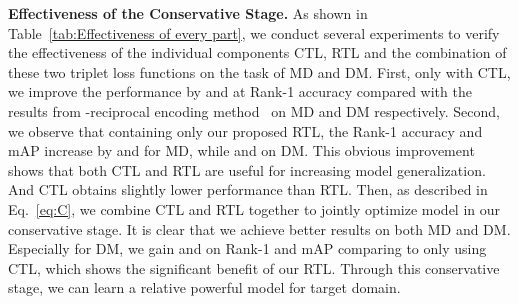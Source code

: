 \documentclass[10pt,twocolumn,letterpaper]{article}
\begin{document}
\textbf{Effectiveness of the Conservative Stage.} As shown in Table~\ref{tab:Effectiveness of every part}, we conduct several experiments to verify the effectiveness of the individual components CTL, RTL and the combination of these two triplet loss functions on the task of MD and DM. 
First, only with CTL, we improve the performance by  and  at Rank-1 accuracy compared with the results from -reciprocal encoding method~\cite{rerank} on MD and DM respectively. 
Second, we observe that containing only our proposed RTL, the Rank-1 accuracy and mAP increase by  and  for MD, while  and  on DM. This obvious improvement shows that both CTL and RTL are useful for increasing model generalization. And CTL obtains slightly lower performance than RTL.
Then, as described in Eq.~\eqref{eq:C}, we combine CTL and RTL together to jointly optimize model in our conservative stage. It is clear  that we achieve better results on both MD and DM. Especially for DM, we gain  and  on Rank-1 and mAP comparing to only using CTL, which shows the significant benefit of our RTL. 
Through this conservative stage, we can learn a relative powerful model for target domain. 

\begin{table}
\footnotesize
\setlength{\belowcaptionskip}{-0.2cm}
\setlength{\abovecaptionskip}{-0cm} 
\begin{center}
\end{center}
\caption{The effectiveness of conservative stage and promoting stage in our proposed Self-training with Progressive Augmentation Framework (PAST). DM represents that we use Duke~\cite{duke} as source domain and Market-1501~\cite{market1501} as target domain.  denotes that the results are produced by us. \textbf{DT} means Direct Transfer from PCB with 9 regions. \textbf{R} means applying -reciprocal encoding method~\cite{rerank}. \textbf{CTL} represents clustering-based triplet loss~\cite{batchhardtriplet}, while \textbf{RTL} is our proposed ranking-based triplet loss. Our \textbf{PAST} framework consists of conservative stage and promoting stage that are denoted by \textbf{C} and \textbf{P} respectively.}
\label{tab:Effectiveness of every part}
\end{table}
\end{document}
